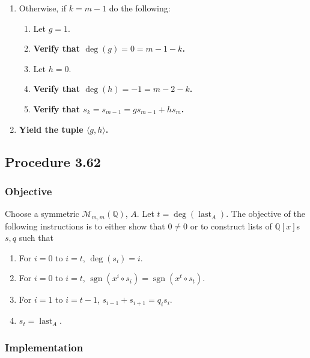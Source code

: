 \documentclass[twocolumn]{article}
\DeclareMathOperator{\sgn}{sgn}
\DeclareMathOperator{\last}{last}
\newcommand{\procedure}[2][]{\subsection*{Procedure #2 \ifthenelse{\equal{#1}{}}{}{(#1)}}\label{sec:procedure #2}}
\newcommand{\objective}{\subsubsection*{Objective}}
\newcommand{\implementation}{\subsubsection*{Implementation}}
\begin{document}
\begin{enumerate}
					\item Otherwise, if $k=m-1$ do the following:
					\begin{enumerate}
						\item Let $g=1$.
						\item \textbf{Verify that $\deg(g)=0=m-1-k$.}
						\item Let $h=0$.
						\item \textbf{Verify that $\deg(h)=-1=m-2-k$.}
						\item \textbf{Verify that $s_k=s_{m-1}=gs_{m-1}+hs_m$.}
					\end{enumerate}
					\item \textbf{Yield the tuple $\langle g,h\rangle$.}
				\end{enumerate}
		\procedure{3.62}
			\objective
				Choose a symmetric $\mathcal{M}_{m,m}(\mathbb{Q})$, $A$. Let $t=\deg(\last_A)$. The objective of the following instructions is to either show that $0\ne 0$ or to construct lists of $\mathbb{Q}[x]$s $s,q$ such that
				\begin{enumerate}
					\item For $i=0$ to $i=t$, $\deg(s_i)=i$.
					\item For $i=0$ to $i=t$, $\sgn(x^i\circ s_i)=\sgn(x^t\circ s_t)$.
					\item For $i=1$ to $i=t-1$, $s_{i-1}+s_{i+1}=q_is_i$.
					\item $s_t=\last_A$.
				\end{enumerate}
			\implementation
\end{document}
